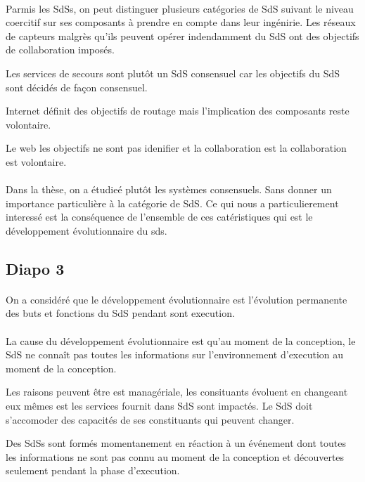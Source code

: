 \paragraph{}
Parmis les SdSs, on peut distinguer plusieurs catégories de SdS
suivant le niveau coercitif sur ses composants à prendre en compte 
dans leur ingénirie.
Les réseaux de capteurs malgrès qu'ils peuvent opérer indendamment du
SdS ont des objectifs de collaboration imposés.

Les services de secours sont plutôt un SdS consensuel car les
objectifs du SdS sont décidés de façon consensuel.

Internet définit des objectifs de routage mais l'implication des
composants reste volontaire.

Le web les objectifs ne sont pas idenifier et la collaboration est la
collaboration est volontaire.

\paragraph{}
Dans la thèse, on a étudieé plutôt les systèmes consensuels. Sans
donner un importance particulière à la catégorie de SdS. Ce qui nous a
particulierement interessé est la conséquence de l'ensemble de ces
catéristiques qui est le développement évolutionnaire du sds. 


\subsection{Diapo 3}
\paragraph{}
On a considéré que le développement évolutionnaire est l'évolution
permanente des buts et fonctions du SdS pendant sont execution. 

\paragraph{} 
La cause du développement évolutionnaire est qu'au moment de la
conception, le SdS ne connaît pas toutes les informations sur
l'environnement d'execution au moment de la conception. 

Les raisons peuvent être est managériale, les consituants évoluent en
changeant eux mêmes est les services fournit dans SdS sont impactés.
Le SdS doit s'accomoder des capacités de ses constituants qui peuvent
changer. 

Des SdSs sont formés momentanement en réaction à un événement dont
toutes les informations ne sont pas connu au moment de la conception
et découvertes seulement pendant la phase d'execution.    


